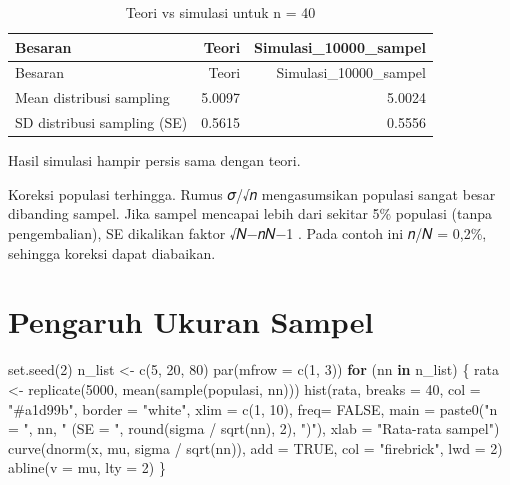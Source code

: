 \documentclass[
  indonesian,
  letterpaper,
]{book}
\newenvironment{Shaded}{\begin{snugshade}}{\end{snugshade}}
\newcommand{\AttributeTok}[1]{\textcolor[rgb]{0.40,0.45,0.13}{#1}}
\newcommand{\ConstantTok}[1]{\textcolor[rgb]{0.56,0.35,0.01}{#1}}
\newcommand{\ControlFlowTok}[1]{\textcolor[rgb]{0.00,0.23,0.31}{\textbf{#1}}}
\newcommand{\DecValTok}[1]{\textcolor[rgb]{0.68,0.00,0.00}{#1}}
\newcommand{\FunctionTok}[1]{\textcolor[rgb]{0.28,0.35,0.67}{#1}}
\newcommand{\NormalTok}[1]{\textcolor[rgb]{0.00,0.23,0.31}{#1}}
\newcommand{\OtherTok}[1]{\textcolor[rgb]{0.00,0.23,0.31}{#1}}
\newcommand{\SpecialCharTok}[1]{\textcolor[rgb]{0.37,0.37,0.37}{#1}}
\newcommand{\StringTok}[1]{\textcolor[rgb]{0.13,0.47,0.30}{#1}}
\begin{document}
\begin{longtable}[]{@{}lrr@{}}
\caption{Teori vs simulasi untuk n = 40}\tabularnewline
\toprule\noalign{}
Besaran & Teori & Simulasi\_10000\_sampel \\
\midrule\noalign{}
\endfirsthead
\toprule\noalign{}
Besaran & Teori & Simulasi\_10000\_sampel \\
\midrule\noalign{}
\endhead
\bottomrule\noalign{}
\endlastfoot
Mean distribusi sampling & 5.0097 & 5.0024 \\
SD distribusi sampling (SE) & 0.5615 & 0.5556 \\
\end{longtable}

Hasil simulasi hampir persis sama dengan teori.

Koreksi populasi terhingga. Rumus 𝜎/√𝑛 mengasumsikan populasi sangat
besar dibanding sampel. Jika sampel mencapai lebih dari sekitar 5\%
populasi (tanpa pengembalian), SE dikalikan faktor √𝑁−𝑛𝑁−1 . Pada contoh
ini 𝑛/𝑁 = 0,2\%, sehingga koreksi dapat diabaikan.

\section{Pengaruh Ukuran Sampel}\label{pengaruh-ukuran-sampel}

\begin{Shaded}
\begin{Highlighting}[]
\FunctionTok{set.seed}\NormalTok{(}\DecValTok{2}\NormalTok{)}
\NormalTok{n\_list }\OtherTok{\textless{}{-}} \FunctionTok{c}\NormalTok{(}\DecValTok{5}\NormalTok{, }\DecValTok{20}\NormalTok{, }\DecValTok{80}\NormalTok{)}
\FunctionTok{par}\NormalTok{(}\AttributeTok{mfrow =} \FunctionTok{c}\NormalTok{(}\DecValTok{1}\NormalTok{, }\DecValTok{3}\NormalTok{))}
\ControlFlowTok{for}\NormalTok{ (nn }\ControlFlowTok{in}\NormalTok{ n\_list) \{}
\NormalTok{rata }\OtherTok{\textless{}{-}} \FunctionTok{replicate}\NormalTok{(}\DecValTok{5000}\NormalTok{, }\FunctionTok{mean}\NormalTok{(}\FunctionTok{sample}\NormalTok{(populasi, nn)))}
\FunctionTok{hist}\NormalTok{(rata, }\AttributeTok{breaks =} \DecValTok{40}\NormalTok{, }\AttributeTok{col =} \StringTok{"\#a1d99b"}\NormalTok{, }\AttributeTok{border =} \StringTok{"white"}\NormalTok{, }\AttributeTok{xlim =} \FunctionTok{c}\NormalTok{(}\DecValTok{1}\NormalTok{, }\DecValTok{10}\NormalTok{), }\AttributeTok{freq=} \ConstantTok{FALSE}\NormalTok{,}
\AttributeTok{main =} \FunctionTok{paste0}\NormalTok{(}\StringTok{"n = "}\NormalTok{, nn, }\StringTok{" (SE = "}\NormalTok{, }\FunctionTok{round}\NormalTok{(sigma }\SpecialCharTok{/} \FunctionTok{sqrt}\NormalTok{(nn), }\DecValTok{2}\NormalTok{), }\StringTok{")"}\NormalTok{),}
\AttributeTok{xlab =} \StringTok{"Rata{-}rata sampel"}\NormalTok{)}
\FunctionTok{curve}\NormalTok{(}\FunctionTok{dnorm}\NormalTok{(x, mu, sigma }\SpecialCharTok{/} \FunctionTok{sqrt}\NormalTok{(nn)), }\AttributeTok{add =} \ConstantTok{TRUE}\NormalTok{, }\AttributeTok{col =} \StringTok{"firebrick"}\NormalTok{, }\AttributeTok{lwd =} \DecValTok{2}\NormalTok{)}
\FunctionTok{abline}\NormalTok{(}\AttributeTok{v =}\NormalTok{ mu, }\AttributeTok{lty =} \DecValTok{2}\NormalTok{)}
\NormalTok{\}}
\end{Highlighting}
\end{Shaded}
\end{document}
